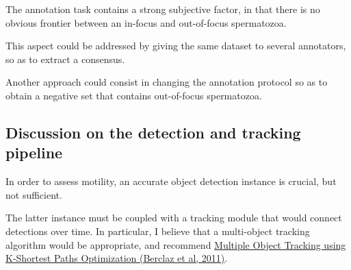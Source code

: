 \documentclass[11pt]{article}
\begin{document}
The annotation task contains a strong subjective factor, in that there is no obvious frontier between an
in-focus and out-of-focus spermatozoa.

This aspect could be addressed by giving the same dataset to several annotators, so as to
extract a consensus.

Another approach could consist in changing the annotation protocol so as to obtain a negative set that contains out-of-focus spermatozoa.

\subsection{Discussion on the detection and tracking pipeline}
\label{sec:org81098bf}

In order to assess motility, an accurate object detection instance is crucial, but not sufficient.

The latter instance must be coupled with a tracking module that would connect detections over time.
In particular, I believe that a multi-object tracking algorithm would be appropriate,
and recommend \href{https://infoscience.epfl.ch/record/164041?ln=en}{Multiple Object Tracking using K-Shortest Paths Optimization (Berclaz et al, 2011)}.
\end{document}
